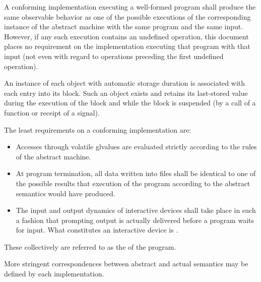 %
%
\pnum
A conforming implementation executing a well-formed program shall
produce the same observable behavior as one of the possible executions
of the corresponding instance of the abstract machine with the
same program and the same input.
%
However, if any such execution contains an undefined operation, this document places no
requirement on the implementation executing that program with that input
(not even with regard to operations preceding the first undefined
operation).

\pnum
An instance of each object with automatic storage
duration is associated with each entry into its
block. Such an object exists and retains its last-stored value during
the execution of the block and while the block is suspended (by a call
of a function or receipt of a signal).

\pnum
The least requirements on a conforming implementation are:
\begin{itemize}
\item
Accesses through volatile glvalues are evaluated strictly according to the
rules of the abstract machine.
\item
At program termination, all data written into files shall be
identical to one of the possible results that execution of the program
according to the abstract semantics would have produced.
\item
The input and output dynamics of interactive devices shall take
place in such a fashion that prompting output is actually delivered before a program waits for input. What constitutes an interactive device is
.
\end{itemize}

These collectively are referred to as the
 of the program.
\begin{note} More stringent correspondences between abstract and actual
semantics may be defined by each implementation. \end{note}


